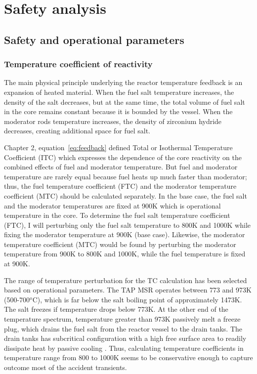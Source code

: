 \chapter[Safety analysis]{Safety analysis}

\section{Safety and operational parameters}

\subsection{Temperature coefficient of reactivity}
The main physical principle underlying the reactor temperature feedback is an 
expansion of heated material. When the fuel salt temperature increases, the 
density of the salt decreases, but at the same time, the total volume of fuel 
salt in the core remains constant because it is bounded by the vessel. When 
the moderator rods temperature increases, the density of zirconium hydride 
decreases, creating additional space for fuel salt. 

Chapter 2, equation~\ref{eq:feedback} defined Total or Isothermal Temperature 
Coefficient (ITC) which expresses the dependence of the core reactivity on the 
combined effects of fuel and moderator temperature. But fuel and moderator 
temperature are rarely equal because fuel heats up much faster than moderator; 
thus, the fuel temperature coefficient (FTC) and the moderator temperature 
coefficient (MTC) should be calculated separately. In the base 
case, the fuel salt and the moderator temperatures are fixed at 900K which is  
operational temperature in the core. To determine the fuel salt temperature 
coefficient (FTC), I will perturbing only the fuel salt temperature to 800K 
and 1000K while fixing the moderator temperature at 900K (base case).  
Likewise, the moderator temperature coefficient (MTC) would be found by 
perturbing the moderator temperature from 900K to 800K and 1000K, while the 
fuel temperature is fixed at 900K. 

The range of temperature perturbation for the TC calculation has been selected 
based on operational parameters. The \gls{TAP} \gls{MSR} operates between 773 
and 973K (500-700$^o$C), which is far below the salt boiling point of 
approximately 1473K. The salt freezes if temperature drops below 773K. At the 
other end of the temperature spectrum, temperature greater than 973K passively 
melt a freeze plug, which drains the fuel salt from the reactor vessel to the  
drain tanks. The drain tanks has subcritical configuration with a high free 
surface area to readily dissipate heat by passive cooling 
\cite{transatomic_power_corporation_technical_2016}. Thus, calculating 
temperature coefficients in temperature range from 800 to 1000K seems to be 
conservative enough to capture outcome most of the accident transients.

